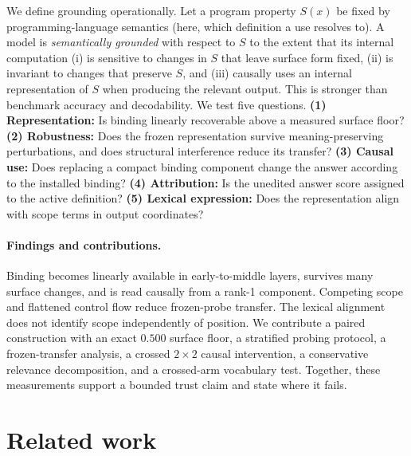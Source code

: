 \documentclass[10pt]{article}
\begin{document}
We define grounding operationally. Let a program property $S(x)$ be fixed by
programming-language semantics (here, which definition a use resolves to). A
model is \emph{semantically grounded} with respect to $S$ to the extent that its
internal computation (i) is sensitive to changes in $S$ that leave surface form
fixed, (ii) is invariant to changes that preserve $S$, and (iii) causally uses an
internal representation of $S$ when producing the relevant output. This is
stronger than benchmark accuracy and decodability. We test five questions.
\textbf{(1) Representation:} Is binding linearly recoverable above a measured
surface floor? \textbf{(2) Robustness:} Does the frozen representation survive
meaning-preserving perturbations, and does structural interference reduce its
transfer? \textbf{(3) Causal use:} Does replacing a compact binding component
change the answer according to the installed binding? \textbf{(4) Attribution:}
Is the unedited answer score assigned to the active definition?
\textbf{(5) Lexical expression:} Does the representation align with scope terms
in output coordinates?

\paragraph{Findings and contributions.} Binding becomes linearly available in
early-to-middle layers, survives many surface changes, and is read causally from
a rank-1 component. Competing scope and flattened control flow reduce frozen-probe
transfer. The lexical alignment does not identify scope independently of position.
We contribute a paired construction with an exact $0.500$ surface floor, a
stratified probing protocol, a frozen-transfer analysis, a crossed $2\times2$
causal intervention, a conservative relevance decomposition, and a crossed-arm
vocabulary test. Together, these measurements support a bounded trust claim and
state where it fails.

\section{Related work}
\end{document}
